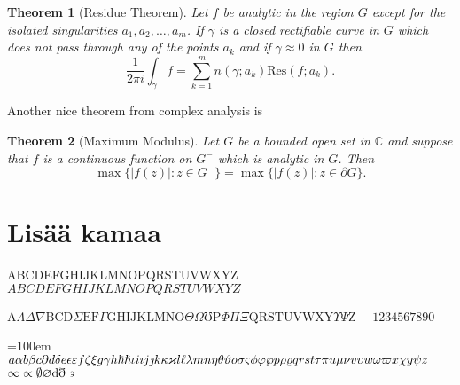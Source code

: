 
\newtheorem{theorem}{Theorem}


\begin{theorem}[Residue Theorem]
Let $f$ be analytic in the region $G$ except for the isolated singularities $a_1,a_2,\ldots,a_m$. If $\gamma$ is a closed rectifiable curve in $G$ which does not pass through any of the points $a_k$ and if $\gamma\approx 0$ in $G$ then
\[
\frac{1}{2\pi i}\int_\gamma f = \sum_{k=1}^m n(\gamma;a_k) \text{Res}(f;a_k).
\]
\end{theorem}

Another nice theorem from complex analysis is

\begin{theorem}[Maximum Modulus]
Let $G$ be a bounded open set in $\mathbb{C}$ and suppose that $f$ is a continuous function on $G^-$ which is analytic in $G$. Then
\[
\max\{|f(z)|:z\in G^-\}=\max \{|f(z)|:z\in \partial G \}.
\]
\end{theorem}

\newcommand{\abc}{abcdefgh\hbar\hslash i\imath j\jmath klmnopqrstuvwxyz}
\newcommand{\ABC}{ABCDEFGHIJKLMNOPQRSTUVWXYZ}
\newcommand{\alphabeta}{\alpha\beta\varbeta\gamma\delta\epsilon\varepsilon\zeta\eta\theta\vartheta\iota\kappa\varkappa\lambda\mu\nu\xi o\pi\varpi\rho\varrho\sigma\varsigma\tau\upsilon\phi\varphi\chi\psi\omega}
\newcommand{\AlphaBeta}{\Gamma\Delta\Theta\Lambda\Xi\Pi\Sigma\Upsilon\Phi\Psi\Omega}




\chapter{Lisää kamaa}

\ABC \quad $\ABC$

$\mathrm{A} \Lambda \Delta \nabla \mathrm{B C D} \Sigma \mathrm{E F} \Gamma \mathrm{G H I J K L M N O} \Theta \Omega \mho \mathrm{P} \Phi \Pi \Xi \mathrm{Q R S T U V W X Y} \Upsilon \Psi \mathrm{Z} $  $ \quad 1234567890 $

{\par {} \emergencystretch=100em
 $a\alpha b \beta c \partial d \delta e \epsilon \varepsilon f \zeta \xi g \gamma h \hbar \hslash \iota i \imath j \jmath k \kappa  \linebreak[3]
 \varkappa l \ell \lambda m n \eta \theta \vartheta o \sigma \varsigma \phi \varphi \wp p \rho \varrho q r s t \tau \pi u \mu \nu v \linebreak[3]
  \upsilon w \omega \varpi x \chi y \psi z$ $\infty \propto \emptyset
  \varnothing \mathrm{d}\eth \backepsilon  \linebreak[3] $\par}




